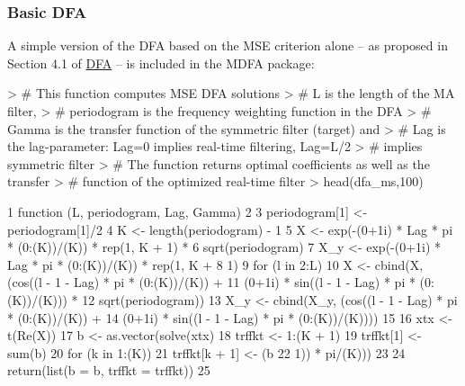 \documentclass[a4paper]{book}
\begin{document}
\subsubsection{Basic DFA}

A simple   version of the DFA  based on the MSE criterion alone -- 
 as proposed in Section 4.1 of \href{http://blog.zhaw.ch/sef/files/2014/10/DFA.pdf}{DFA} --
 is included in the MDFA package:  

\begin{Schunk}
\begin{Sinput}
> # This function computes MSE DFA solutions 
> # L is the length of the MA filter,
> # periodogram is the frequency weighting function in the DFA
> # Gamma is the transfer function of the symmetric filter (target) and
> # Lag is the lag-parameter: Lag=0 implies real-time filtering, Lag=L/2
> #     implies symmetric filter
> # The function returns optimal coefficients as well as the transfer 
> #     function of the optimized real-time filter
> head(dfa_ms,100)
\end{Sinput}
\begin{Soutput}
1  function (L, periodogram, Lag, Gamma)                                    
2  {                                                                        
3      periodogram[1] <- periodogram[1]/2                                   
4      K <- length(periodogram) - 1                                         
5      X <- exp(-(0+1i) * Lag * pi * (0:(K))/(K)) * rep(1, K + 1) *         
6          sqrt(periodogram)                                                
7      X_y <- exp(-(0+1i) * Lag * pi * (0:(K))/(K)) * rep(1, K +            
8          1)                                                               
9      for (l in 2:L) {                                                     
10         X <- cbind(X, (cos((l - 1 - Lag) * pi * (0:(K))/(K)) +           
11             (0+1i) * sin((l - 1 - Lag) * pi * (0:(K))/(K))) *            
12             sqrt(periodogram))                                           
13         X_y <- cbind(X_y, (cos((l - 1 - Lag) * pi * (0:(K))/(K)) +       
14             (0+1i) * sin((l - 1 - Lag) * pi * (0:(K))/(K))))             
15     }                                                                    
16     xtx <- t(Re(X)) %
17     b <- as.vector(solve(xtx) %
18     trffkt <- 1:(K + 1)                                                  
19     trffkt[1] <- sum(b)                                                  
20     for (k in 1:(K)) {                                                   
21         trffkt[k + 1] <- (b %
22             1)) * pi/(K)))                                               
23     }                                                                    
24     return(list(b = b, trffkt = trffkt))                                 
25 }                                                                        
\end{Soutput}
\end{Schunk}
\end{document}
